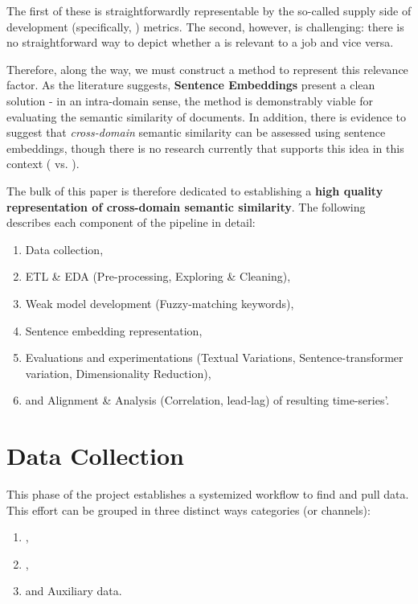 The first of these is straightforwardly representable by the so-called supply side of development (specifically, \gh{}) metrics.
The second, however, is challenging: there is no straightforward way to depict whether a \repo{} is relevant to a job and vice versa.

Therefore, along the way, we must construct a method to represent this relevance factor.
As the literature suggests, \textbf{Sentence Embeddings} present a clean solution - in an intra-domain sense, the method is demonstrably viable for evaluating the semantic similarity of documents.
In addition, there is evidence to suggest that \emph{cross-domain} semantic similarity can be assessed using sentence embeddings, though there is no research currently that supports this idea in this context (\jobposts{} vs. \ghrepo{}).

The bulk of this paper is therefore dedicated to establishing a \textbf{high quality representation of cross-domain semantic similarity}.
The following describes each component of the pipeline in detail:
\begin{enumerate}
    \item Data collection,
    \item ETL \& EDA (Pre-processing, Exploring \& Cleaning),
    \item Weak model development (Fuzzy-matching keywords),
    \item Sentence embedding representation,
    \item Evaluations and experimentations (Textual Variations, Sentence-transformer variation, Dimensionality Reduction),
    \item and Alignment \& Analysis (Correlation, lead-lag) of resulting time-series'.
\end{enumerate}


\section{Data Collection}

This phase of the project establishes a systemized workflow to find and pull data. This effort can be grouped in three distinct ways categories (or channels):
\begin{enumerate}
    \item \jobposts{},
    \item \ghrepo{},
    \item and Auxiliary data.
\end{enumerate}

